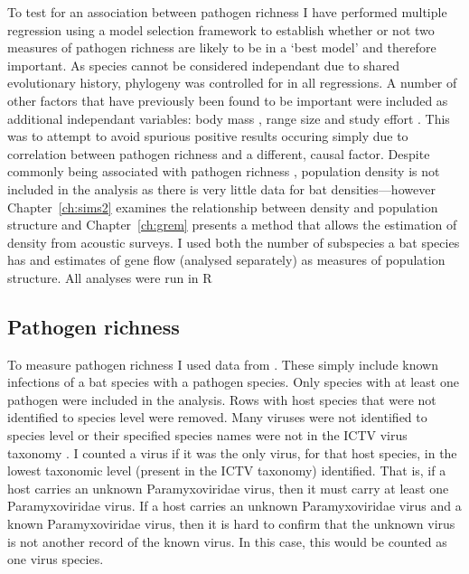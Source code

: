 To test for an association between pathogen richness I have performed multiple regression using a model selection framework to establish whether or not two measures of pathogen richness are likely to be in a `best model' and therefore important.
As species cannot be considered independant due to shared evolutionary history, phylogeny was controlled for in all regressions.
A number of other factors that have previously been found to be important were included as additional independant variables: body mass \cite{kamiya2014determines, turmelle2009correlates, gay2014parasite, maganga2014bat, han2015infectious}, range size \cite{kamiya2014determines, turmelle2009correlates, maganga2014bat} and study effort \cite{turmelle2009correlates, gay2014parasite, maganga2014bat}.
This was to attempt to avoid spurious positive results occuring simply due to correlation between pathogen richness and a different, causal factor.
Despite commonly being associated with pathogen richness \cite{arneberg2002host, kamiya2014determines, nunn2003comparative}, population density is not included in the analysis as there is very little data for bat densities---however Chapter~\ref{ch:sims2} examines the relationship between density and population structure and Chapter~\ref{ch:grem} presents a method that allows the estimation of density from acoustic surveys.
I used both the number of subspecies a bat species has and estimates of gene flow (analysed separately) as measures of population structure.
All analyses were run in R \cite{R}

\subsection{Pathogen richness}

To measure pathogen richness I used data from \cite{luis2013comparison}. 
These simply include known infections of a bat species with a pathogen species. 
Only species with at least one pathogen were included in the analysis.
Rows with host species that were not identified to species level were removed.
Many viruses were not identified to species level or their specified species names were not in the ICTV virus taxonomy \cite{ICTV}.
I counted a virus if it was the only virus, for that host species, in the lowest taxonomic level (present in the ICTV taxonomy) identified.
That is, if a host carries an unknown Paramyxoviridae virus, then it must carry at least one Paramyxoviridae virus.
If a host carries an unknown Paramyxoviridae virus and a known Paramyxoviridae virus, then it is hard to confirm that the unknown virus is not another record of the known virus.
In this case, this would be counted as one virus species.






